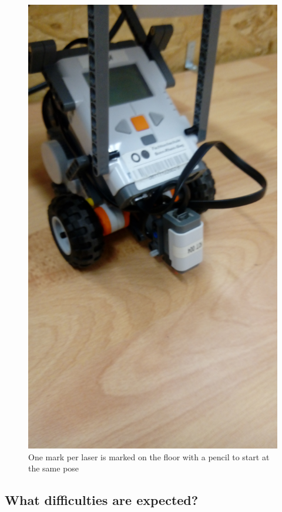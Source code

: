 \documentclass[10pt]{scrartcl}
\begin{document}
\begin{figure}[ht!]
\centering
\includegraphics[angle=-90,trim={1200 700 1000 300},clip,scale=0.10]{images/initChecker}
\caption{One mark per laser is marked on the floor with a pencil to start at the same pose}
\label{fig:initMatcher}
\end{figure}


\subsection*{What difficulties are expected?}
\end{document}

